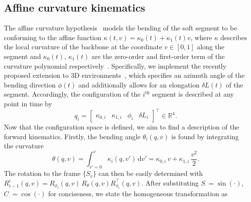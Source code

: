 \subsection{Affine curvature kinematics}\label{sub:promasens:kinematic_model_ac}
The affine curvature hypothesis~\citep{della2020soft, stella2023piecewise} models the bending of the soft segment to be conforming to the affine function $\kappa(t,v) = \kappa_0(t) + \kappa_1(t) v$, where $\kappa$ describes the local curvature of the backbone at the coordinate $v \in [0, 1]$ along the segment and $\kappa_0(t)$, $\kappa_1(t)$ are the zero-order and first-order term of the curvature polynomial respectively~\citep{della2019control}.
Specifically, we implement the recently proposed extension to 3D environments~\citep{stella2023piecewise}, which specifies an azimuth angle of the bending direction $\phi(t)$ and additionally allows for an elongation $\delta L(t)$ of the segment.
Accordingly, the configuration of the $i^\mathrm{th}$ segment is described at any point in time by
\begin{equation}
    q_i = \begin{bmatrix}\kappa_{0,i} & \kappa_{1,i} & \phi_i & \delta L_{i} \end{bmatrix}^{\top} \in \mathbb{R}^4.
\end{equation}
Now that the configuration space is defined, we aim to find a description of the forward kinematics. Firstly, the bending angle $\theta_i(q, v)$ is found by integrating the curvature
\begin{equation}
    \theta(q,v) = \int_{v'=0}^{v} \kappa_i(q, v') \, \mathrm{d}v' = \kappa_{0,i} \, v + \kappa_{1,i} \, \frac{v^2}{2}.
\end{equation}
The rotation to the frame $\{S_{v}\}$ can then be easily determined with $R_{i-1}^{i}(q,v) = R_{\phi_i}(q,v) \, R_{\theta}(q,v) R_{\phi_i}^\top(q,v)$. After substituting $S_{\cdot} = \sin(\cdot)$, $C_{\cdot} = \cos(\cdot)$ for conciseness, we state the homogeneous transformation as
